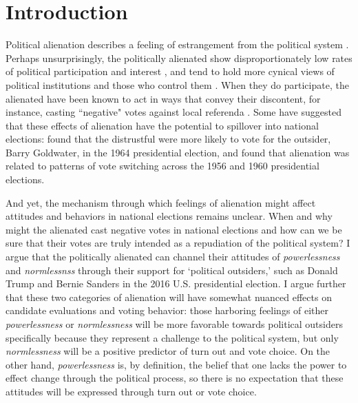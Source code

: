 \documentclass[12pt]{article}
\begin{document}
\section{Introduction}
Political alienation describes a feeling of estrangement from the political system \parencite{citrin1975,olsen1969}. Perhaps unsurprisingly, the politically alienated show disproportionately low rates of political participation and interest \parencite{finifter1970dimensions,templeton1966}, and tend to hold more cynical views of political institutions and those who control them \parencite{mcdill1962status,thompson1960,templeton1966}. When they do participate, the alienated have been known to act in ways that convey their discontent, for instance, casting ``negative" votes against local referenda \parencite{horton1962powerlessness,mcdill1962status}. Some have suggested that these effects of alienation have the potential to spillover into national elections: \textcite{aberbach1969alienation} found that the distrustful were more likely to vote for the outsider, Barry Goldwater, in the 1964 presidential election, and \textcite{templeton1966} found that alienation was related to patterns of vote switching across the 1956 and 1960 presidential elections.

 And yet, the mechanism through which feelings of alienation might affect attitudes and behaviors in national elections remains unclear. When and why might the alienated cast negative votes in national elections and how can we be sure that their votes are truly intended as a repudiation of the political system? I argue that the politically alienated can channel their attitudes of \textit{powerlessness} and \textit{normlessnss} \parencite{finifter1970dimensions} through their support for `political outsiders,' such as Donald Trump and Bernie Sanders in the 2016 U.S. presidential election. I argue further that these two categories of alienation will have somewhat nuanced effects on candidate evaluations and voting behavior: those harboring feelings of either \textit{powerlessness} or \textit{normlessness} will be more favorable towards political outsiders specifically because they represent a challenge to the political system, but only \textit{normlessness} will be a positive predictor of turn out and vote choice. On the other hand, \textit{powerlessness} is, by definition, the belief that one lacks the power to effect change through the political process, so there is no expectation that these attitudes will be expressed through turn out or vote choice. 
 
\end{document}
